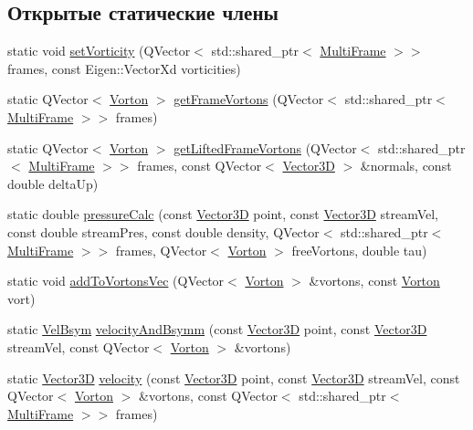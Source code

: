 \subsection*{Открытые статические члены}
\begin{DoxyCompactItemize}
\item 
static void \mbox{\hyperlink{class_frame_calculations_a564f527920433ef1fc56b8476abc381d}{set\+Vorticity}} (Q\+Vector$<$ std\+::shared\+\_\+ptr$<$ \mbox{\hyperlink{class_multi_frame}{Multi\+Frame}} $>$$>$ frames, const Eigen\+::\+Vector\+Xd vorticities)
\item 
static Q\+Vector$<$ \mbox{\hyperlink{class_vorton}{Vorton}} $>$ \mbox{\hyperlink{class_frame_calculations_a36e9c485fa20dc63addfa5f859466a4f}{get\+Frame\+Vortons}} (Q\+Vector$<$ std\+::shared\+\_\+ptr$<$ \mbox{\hyperlink{class_multi_frame}{Multi\+Frame}} $>$$>$ frames)
\item 
static Q\+Vector$<$ \mbox{\hyperlink{class_vorton}{Vorton}} $>$ \mbox{\hyperlink{class_frame_calculations_a5d8360d713e0b70ef16836c393875898}{get\+Lifted\+Frame\+Vortons}} (Q\+Vector$<$ std\+::shared\+\_\+ptr$<$ \mbox{\hyperlink{class_multi_frame}{Multi\+Frame}} $>$$>$ frames, const Q\+Vector$<$ \mbox{\hyperlink{class_vector3_d}{Vector3D}} $>$ \&normals, const double delta\+Up)
\item 
static double \mbox{\hyperlink{class_frame_calculations_a649d97062701534e3c658717aa7fc328}{pressure\+Calc}} (const \mbox{\hyperlink{class_vector3_d}{Vector3D}} point, const \mbox{\hyperlink{class_vector3_d}{Vector3D}} stream\+Vel, const double stream\+Pres, const double density, Q\+Vector$<$ std\+::shared\+\_\+ptr$<$ \mbox{\hyperlink{class_multi_frame}{Multi\+Frame}} $>$$>$ frames, Q\+Vector$<$ \mbox{\hyperlink{class_vorton}{Vorton}} $>$ free\+Vortons, double tau)
\item 
static void \mbox{\hyperlink{class_frame_calculations_aefef30822ffab57ba2a36750470a9589}{add\+To\+Vortons\+Vec}} (Q\+Vector$<$ \mbox{\hyperlink{class_vorton}{Vorton}} $>$ \&vortons, const \mbox{\hyperlink{class_vorton}{Vorton}} vort)
\item 
static \mbox{\hyperlink{struct_vel_bsym}{Vel\+Bsym}} \mbox{\hyperlink{class_frame_calculations_a970373138ceb791f8fe4983be4fe3453}{velocity\+And\+Bsymm}} (const \mbox{\hyperlink{class_vector3_d}{Vector3D}} point, const \mbox{\hyperlink{class_vector3_d}{Vector3D}} stream\+Vel, const Q\+Vector$<$ \mbox{\hyperlink{class_vorton}{Vorton}} $>$ \&vortons)
\item 
static \mbox{\hyperlink{class_vector3_d}{Vector3D}} \mbox{\hyperlink{class_frame_calculations_aaabc376bcaef6089f68adb42720d5685}{velocity}} (const \mbox{\hyperlink{class_vector3_d}{Vector3D}} point, const \mbox{\hyperlink{class_vector3_d}{Vector3D}} stream\+Vel, const Q\+Vector$<$ \mbox{\hyperlink{class_vorton}{Vorton}} $>$ \&vortons, const Q\+Vector$<$ std\+::shared\+\_\+ptr$<$ \mbox{\hyperlink{class_multi_frame}{Multi\+Frame}} $>$$>$ frames)
$$
\end{DoxyCompactItemize}
